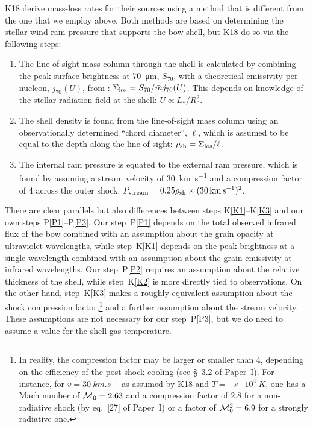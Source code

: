 K18 derive mass-loss rates for their sources using a method that is
different from the one that we employ above.  Both methods are based
on determining the stellar wind ram pressure that supports the bow
shell, but K18 do so via the following steps:
\begin{enumerate}[K1.]
\item \label{K1} The line-of-sight mass column through the shell is
  calculated by combining the peak surface brightness at \SI{70}{\um},
  \(S_{70}\), with a theoretical emissivity per nucleon,
  \(j_{70}(U)\), from \citet{Draine:2007a}:
  \(\Sigma_{\text{los}} = S_{70} / \bar{m} j_{70}(U)\).  This depends on
  knowledge of the stellar radiation field at the shell:
  \(U \propto L_* / R_0^2\).
\item \label{K2} The shell density is found from the line-of-sight
  mass column using an observationally determined ``chord diameter'',
  \(\ell\), which is assumed to be equal to the depth along the line
  of sight: \(\rho_{\text{sh}} = \Sigma_{\text{los}} / \ell\).
\item \label{K3} The internal ram pressure is equated to the external
  ram pressure, which is found by assuming a stream velocity of
  \SI{30}{km.s^{-1}} and a compression factor of 4 across the outer
  shock:
  \(P_{\text{stream}} = 0.25 \rho_{\text{sh}} \times
  (\SI{30}{km.s^{-1}})^2\).
\end{enumerate}
There are clear parallels but also differences between steps
K\ref{K1}--K\ref{K3} and our own steps P\ref{P1}--P\ref{P3}.  Our
step~P\ref{P1} depends on the total observed infrared flux of the bow
combined with an assumption about the grain opacity at ultraviolet
wavelengths, while step~K\ref{K1} depends on the peak brightness at a
single wavelength combined with an assumption about the grain
emissivity at infrared wavelengths.  Our step~P\ref{P2} requires an
assumption about the relative thickness of the shell, while
step~K\ref{K2} is more directly tied to observations.
On the other hand, step~K\ref{K3} makes a roughly equivalent
assumption about the shock compression factor,\footnote{%
  In reality, the compression factor may be larger or smaller than 4,
  depending on the efficiency of the post-shock cooling (see
  \S~3.2 of Paper~I).  For instance, for \(v = \SI{30}{km.s^{-1}}\) as
  assumed by K18 and \(T = \SI{e4}{K}\), one has a Mach number of
  \(\mathcal{M}_0 = 2.63\) and a compression factor of 2.8 for a non-radiative
  shock (by
  eq.~[27] of Paper~I) or a factor of
  \(\mathcal{M}_0^2 =6.9\) for a strongly radiative one.} %
and a further assumption about the stream velocity. These assumptions
are not necessary for our step~P\ref{P3}, but we do need to assume a
value for the shell gas temperature.

